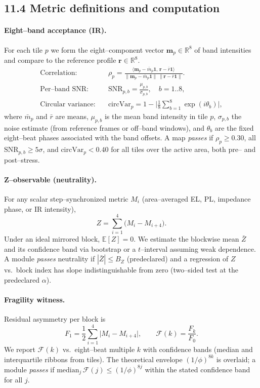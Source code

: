 \documentclass[12pt]{article}
\begin{document}
\subsection*{11.4 Metric definitions and computation}
\paragraph{Eight–band acceptance (IR).}
For each tile $p$ we form the eight–component vector $\mathbf{m}_p\in\mathbb{R}^8$ of band intensities and compare to the reference profile $\mathbf{r}\in\mathbb{R}^8$.
\begin{align}
\text{Correlation:}\quad
&\rho_p=\frac{\langle \mathbf{m}_p-\bar m_p\mathbf{1},\,\mathbf{r}-\bar r\mathbf{1}\rangle}{\|\mathbf{m}_p-\bar m_p\mathbf{1}\|\,\|\mathbf{r}-\bar r\mathbf{1}\|}.\\
\text{Per–band SNR:}\quad
&\mathrm{SNR}_{p,b}=\frac{\mu_{p,b}}{\sigma_{p,b}},\quad b=1..8,\\
\text{Circular variance:}\quad
&\mathrm{circVar}_p=1-\Big|\frac1{8}\sum_{b=1}^{8}\exp(i\theta_b)\Big|,
\end{align}
where $\bar m_p$ and $\bar r$ are means, $\mu_{p,b}$ is the mean band intensity in tile $p$, $\sigma_{p,b}$ the noise estimate (from reference frames or off–band windows), and $\theta_b$ are the fixed eight–beat phases associated with the band offsets. A map \emph{passes} if $\rho_p\ge0.30$, all $\mathrm{SNR}_{p,b}\ge5\sigma$, and $\mathrm{circVar}_p<0.40$ for all tiles over the active area, both pre– and post–stress.

\paragraph{Z–observable (neutrality).}
For any scalar step–synchronized metric $M_i$ (area–averaged EL, PL, impedance phase, or IR intensity),
\[
Z=\sum_{i=1}^{4}\big(M_i-M_{i+4}\big).
\]
Under an ideal mirrored block, $\mathbb{E}[Z]=0$. We estimate the blockwise mean $\bar Z$ and its confidence band via bootstrap or a $t$–interval assuming weak dependence. A module \emph{passes} neutrality if $|\bar Z|\le B_Z$ (predeclared) and a regression of $Z$ vs.\ block index has slope indistinguishable from zero (two–sided test at the predeclared $\alpha$).

\paragraph{Fragility witness.}
Residual asymmetry per block is
\[
F_1=\frac12\sum_{i=1}^{4}\big|M_i-M_{i+4}\big|,\qquad \mathcal{F}(k)=\frac{F_k}{F_0}.
\]
We report $\mathcal{F}(k)$ vs.\ eight–beat multiple $k$ with confidence bands (median and interquartile ribbons from tiles). The theoretical envelope $(1/\phi)^{8k}$ is overlaid; a module \emph{passes} if $\mathrm{median}_j\,\mathcal{F}(j)\le (1/\phi)^{8j}$ within the stated confidence band for all $j$.
\end{document}
